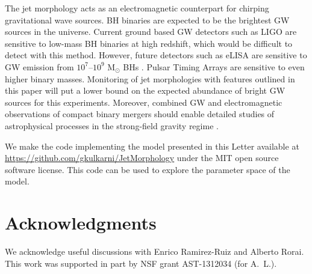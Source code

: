 \documentclass[a4paper,fleqn,usenatbib]{mnras}
\begin{document}
The jet morphology acts as an electromagnetic counterpart for chirping
gravitational wave sources.  BH binaries are expected to be the
brightest GW sources in the universe.  Current ground based GW
detectors such as LIGO are sensitive to low-mass BH binaries at high
redshift, which would be difficult to detect with this method.
However, future detectors such as eLISA are sensitive to GW emission
from $10^7$--$10^9$ M$_\odot$ BHs \citep{2013CQGra..30x4009S}.  Pulsar
Timing Arrays are sensitive to even higher binary masses.  Monitoring
of jet morphologies with features outlined in this paper will put a
lower bound on the expected abundance of bright GW sources for this
experiments. Moreover, combined GW and electromagnetic observations of
compact binary mergers should enable detailed studies of astrophysical
processes in the strong-field gravity regime
\citep{2005ApJ...629...15H}.

We make the code implementing the model presented in this Letter
available at \url{https://github.com/gkulkarni/JetMorphology} under
the MIT open source software license.  This code can be used to
explore the parameter space of the model. 

\section*{Acknowledgments}

We acknowledge useful discussions with Enrico Ramirez-Ruiz and Alberto
Rorai.  This work was supported in part by NSF grant AST-1312034 (for
A.~L.).


 

\bsp
\label{lastpage}
\end{document}
